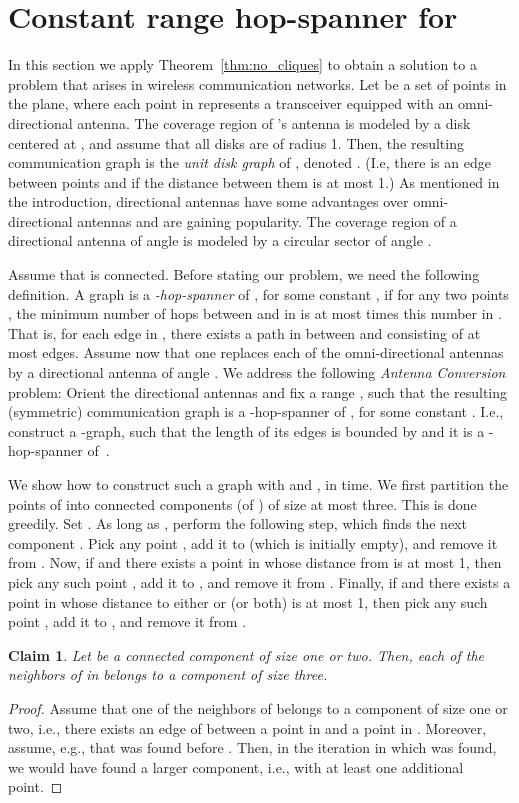 \documentclass[11pt]{article}
\newtheorem{claim}[theorem]{Claim}
\begin{document}
\section{Constant range hop-spanner for } \label{sec:boundedrange}
In this section we apply Theorem~\ref{thm:no_cliques} to obtain a solution to a problem that arises in wireless communication networks.
Let  be a set of  points in the plane, where each point in  represents a transceiver equipped with an omni-directional antenna. The coverage region of 's antenna is modeled by a disk centered at , and assume that all disks are of radius 1. Then, the resulting communication graph is the {\em unit disk graph} of , denoted . (I.e, there is an edge between points  and  if the distance between them is at most 1.)
As mentioned in the introduction, directional antennas have some advantages over omni-directional antennas and are gaining popularity. The coverage region of a directional antenna of angle  is modeled by a circular sector of angle . 

Assume that  is connected.
Before stating our problem, we need the following definition. 
A graph  is a {\em -hop-spanner} of , for some constant , if for any two points , the minimum number of hops between  and  in  is at most  times this number in . That is, for each edge  in , there exists a path in  between  and  consisting of at most  edges. Assume now that one replaces each of the omni-directional antennas by a directional antenna of angle . We address the following {\em Antenna Conversion} problem:
Orient the directional antennas and fix a range , such that the resulting (symmetric) communication graph is a -hop-spanner of , for some constant . I.e., construct a -graph, such that the length of its edges is bounded by  and it is a -hop-spanner of~.

We show how to construct such a graph with  and , in  time.
We first partition the points of  into connected components (of ) of size at most three. This is done greedily. Set . As long as , perform the following step, which finds the next component . Pick any point , add it to  (which is initially empty), and remove it from . Now, if  and there exists a point in  whose distance from  is at most 1, then pick any such point , add it to , and remove it from . Finally, if  and there exists a point in  whose distance to either  or  (or both) is at most 1, then pick any such point , add it to , and remove it from . 

\begin{claim}
\label{clm:comp}
Let  be a connected component of size one or two. Then, each of the neighbors of  in  belongs to a component of size three.
\end{claim}
\begin{proof}
Assume that one of the neighbors of  belongs to a component  of size one or two, i.e., there exists an edge of  between a point in  and a point in . Moreover, assume, e.g., that  was found before . Then, in the iteration in which  was found, we would have found a larger component, i.e., with at least one additional point.
\end{proof}
\end{document}
